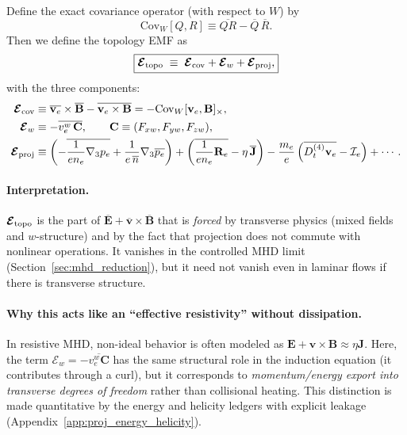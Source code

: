 \documentclass[11pt]{article}
\newcommand{\gradthree}{\nabla_3}
\begin{document}
Define the exact covariance operator (with respect to \(W\)) by
\begin{equation}
\mathrm{Cov}_W[Q,R]\equiv \overline{QR}-\overline{Q}\,\overline{R}.
\label{eq:covW_def_ohm}
\end{equation}
Then we define the topology EMF as
\begin{equation}
\boxed{
\boldsymbol{\mathcal{E}}_{\rm topo}
\;\equiv\;
\boldsymbol{\mathcal{E}}_{\rm cov}
+\boldsymbol{\mathcal{E}}_{w}
+\boldsymbol{\mathcal{E}}_{\rm proj},
}
\label{eq:Etopo_def}
\end{equation}
with the three components:
\begin{align}
\boldsymbol{\mathcal{E}}_{\rm cov}
&\equiv
\overline{\mathbf{v}_e}\times\overline{\mathbf{B}}
-\overline{\mathbf{v}_e\times\mathbf{B}}
=
-\mathrm{Cov}_W[\mathbf{v}_e,\mathbf{B}]_{\times},
\label{eq:Ecov_def_ohm}
\\
\boldsymbol{\mathcal{E}}_{w}
&\equiv
-\overline{v_e^w\,\mathbf{C}},
\qquad \mathbf{C}\equiv(F_{xw},F_{yw},F_{zw}),
\label{eq:Ew_def_ohm}
\\
\boldsymbol{\mathcal{E}}_{\rm proj}
&\equiv
\left(
-\overline{\frac{1}{e n_e}\gradthree p_e}
+\frac{1}{e\,\overline{n}}\gradthree\overline{p_e}
\right)
+
\left(
\overline{\frac{1}{e n_e}\mathbf{R}_e}
-\eta\,\overline{\mathbf{J}}
\right)
-\frac{m_e}{e}\left(\overline{D_t^{(4)}\mathbf{v}_e}-\mathcal{I}_e\right)
+\cdots.
\label{eq:Eproj_def_ohm}
\end{align}

\paragraph{Interpretation.}
\(\boldsymbol{\mathcal{E}}_{\rm topo}\) is the part of \(\overline{\mathbf{E}}+\overline{\mathbf{v}}\times\overline{\mathbf{B}}\)
that is \emph{forced} by transverse physics (mixed fields and \(w\)-structure) and by the fact that
projection does not commute with nonlinear operations. It vanishes in the controlled MHD limit
(Section~\ref{sec:mhd_reduction}), but it need not vanish even in laminar flows if there is transverse
structure.

\paragraph{Why this acts like an ``effective resistivity'' without dissipation.}
In resistive MHD, non-ideal behavior is often modeled as \(\mathbf{E}+\mathbf{v}\times\mathbf{B}\approx\eta\mathbf{J}\).
Here, the term \(\boldsymbol{\mathcal{E}}_{w}=-\overline{v_e^w\mathbf{C}}\) has the same structural role in the induction
equation (it contributes through a curl), but it corresponds to \emph{momentum/energy export into transverse degrees of freedom}
rather than collisional heating. This distinction is made quantitative by the energy and helicity ledgers with explicit leakage
(Appendix~\ref{app:proj_energy_helicity}).
\end{document}
